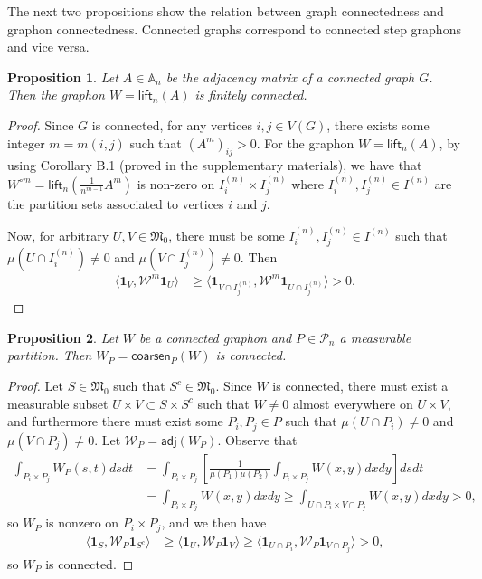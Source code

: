\documentclass[11pt]{article}
\def\AA{\mathbb{A}}
\def\II{\bm{1}}
\def\calP{\mathcal{P}}
\def\calW{\mathcal{W}}
\def\frakM{\mathfrak{M}_0}
\newcommand{\sans}[1]{\mathsf{#1}}
\def\adj{\sans{adj}}
\def\lift{\sans{lift}}
\def\coarsen{\sans{coarsen}}
\newtheorem{proposition}{Proposition}[section]
\theoremstyle{definition}
\begin{document}
The next two propositions show the relation between graph connectedness and graphon connectedness. Connected graphs correspond to connected step graphons and vice versa.

\begin{proposition}
    Let $A \in \AA_n$ be the adjacency matrix of a connected graph $G$. Then the graphon $W = \lift_n (A)$ is finitely connected.
\end{proposition}
\begin{proof}
    Since $G$ is connected, for any vertices $i,j \in V(G)$, there exists some integer $m = m(i,j)$ such that $(A^m)_{ij} > 0$. For the graphon $W = \lift_n (A)$, by using Corollary B.1 (proved in the supplementary materials), we have that $W^{\circ m} = \lift_n (\frac{1}{n^{m-1}} A^m)$ is non-zero on $I^{(n)}_i \times I^{(n)}_j$ where $I^{(n)}_i, I^{(n)}_j \in I^{(n)}$ are the partition sets associated to vertices $i$ and $j$.

    Now, for arbitrary $U, V \in \frakM$, there must be some $I^{(n)}_i, I^{(n)}_j \in I^{(n)}$ such that $\mu (U \cap I^{(n)}_i) \neq 0$ and $\mu(V \cap I^{(n)}_j) \neq 0$. Then
    \begin{align*}
        \langle \II_V, \calW^m \II_U \rangle &\ge
        \langle \II_{V \cap I^{(n)}_j}, \calW^m \II_{U \cap I^{(n)}_j} \rangle > 0.
    \end{align*}
\end{proof}

\begin{proposition} \label{prop:graphon-coarsen-connected}
    Let $W$ be a connected graphon and $P\in \calP_n$ a measurable partition. Then $W_P = \coarsen_P (W)$ is connected.
\end{proposition}
\begin{proof}
    Let $S \in \frakM$ such that $S^c \in \frakM$. Since $W$ is connected, there must exist a measurable subset $U \times V \subset S \times S^c$ such that $W \neq 0$ almost everywhere on $U \times V$, and furthermore there must exist some $P_i, P_j \in P$ such that $\mu(U \cap P_i) \neq 0$ and $\mu(V \cap P_j) \neq 0$. Let $\calW_P = \adj (W_P)$. Observe that 
    \begin{align*}
        \int_{P_i\times P_j} W_P (s,t) ds dt &= \int_{P_i \times P_j} \left[\frac{1}{\mu(P_1)\mu(P_2)}\int_{P_i\times P_j} W(x,y) dx dy \right] ds dt\\
        &= \int_{P_i\times P_j} W(x,y) dx dy \ge \int_{U \cap P_i \times V \cap P_j} W(x,y) dx dy > 0,
    \end{align*}
    so $W_P$ is nonzero on $P_i \times P_j$, and we then have
    \begin{align*}
        \langle \II_S, \calW_P \II_{S^c} \rangle &\ge \langle \II_U , \calW_P \II_V \rangle \ge \langle \II_{U \cap P_i}, \calW_P \II_{V \cap P_j} \rangle > 0,
    \end{align*}
    so $W_P$ is connected.
\end{proof}
\end{document}
